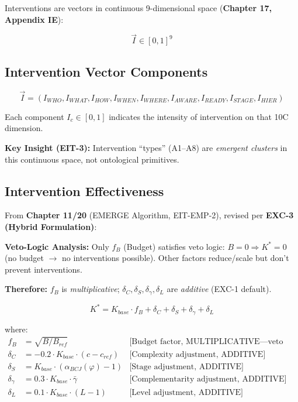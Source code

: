 Interventions are vectors in continuous 9-dimensional space (\textbf{Chapter 17, Appendix IE}):

\begin{equation}
\boxed{
\vec{I} \in [0,1]^9
}
\label{eq:mp-intervention}
\end{equation}

\subsection{Intervention Vector Components}

\begin{equation}
\vec{I} = (I_{WHO}, I_{WHAT}, I_{HOW}, I_{WHEN}, I_{WHERE}, I_{AWARE}, I_{READY}, I_{STAGE}, I_{HIER})
\end{equation}

Each component $I_c \in [0,1]$ indicates the intensity of intervention on that 10C dimension.

\textbf{Key Insight (EIT-3):} Intervention ``types'' (A1--A8) are \textit{emergent clusters}
in this continuous space, not ontological primitives.

\subsection{Intervention Effectiveness}

From \textbf{Chapter 11/20} (EMERGE Algorithm, EIT-EMP-2), revised per \textbf{EXC-3 (Hybrid Formulation)}:

\begin{tcolorbox}[colback=green!5!white, colframe=green!75!black,
    title=\textbf{EXC-3 Compliance: K* Hybrid Formula}]
\textbf{Veto-Logic Analysis:} Only $f_B$ (Budget) satisfies veto logic: $B=0 \Rightarrow K^*=0$ (no budget $\to$ no interventions possible). Other factors reduce/scale but don't prevent interventions.

\textbf{Therefore:} $f_B$ is \textit{multiplicative}; $\delta_C, \delta_S, \delta_\gamma, \delta_L$ are \textit{additive} (EXC-1 default).
\end{tcolorbox}

\begin{equation}
\boxed{
K^* = K_{base} \cdot f_B + \delta_C + \delta_S + \delta_\gamma + \delta_L
}
\label{eq:mp-kstar-formula}
\end{equation}

where:
\begin{align}
f_B &= \sqrt{B/B_{ref}} & \text{[Budget factor, MULTIPLICATIVE---veto logic]} \\
\delta_C &= -0.2 \cdot K_{base} \cdot (c - c_{ref}) & \text{[Complexity adjustment, ADDITIVE]} \\
\delta_S &= K_{base} \cdot (\alpha_{BCJ}(\varphi) - 1) & \text{[Stage adjustment, ADDITIVE]} \\
\delta_\gamma &= 0.3 \cdot K_{base} \cdot \bar{\gamma} & \text{[Complementarity adjustment, ADDITIVE]} \\
\delta_L &= 0.1 \cdot K_{base} \cdot (L - 1) & \text{[Level adjustment, ADDITIVE]}
\end{align}

